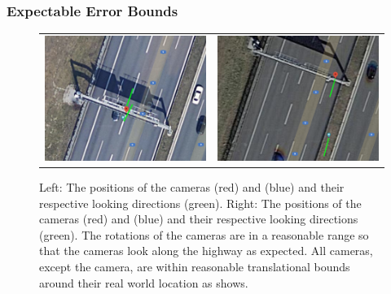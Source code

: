 


\subsubsection{Expectable Error Bounds}

\begin{figure}[t]
  \centering
  \begin{tabular}{cc}
    \includegraphics[width=0.45 \linewidth]{images/calibration/google_maps_s40_n.png} &
    \includegraphics[width=0.45 \linewidth]{images/calibration/google_maps_s50_s.png} 
\end{tabular}
\caption{Left: The positions of the cameras  (red) and  (blue) and their respective looking directions (green). 
Right: The positions of the cameras  (red) and  (blue) and their respective looking directions (green). 
The rotations of the cameras are in a reasonable range so that the cameras look along the highway as expected. 
All cameras, except the  camera, are within reasonable translational bounds around their real world location as  shows.
}
\label{fig:static_calibration_google_maps}
\end{figure}

